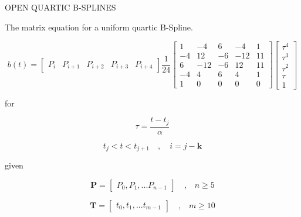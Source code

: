 \documentclass{article}
\begin{document}
\hspace{1cm}
    
OPEN QUARTIC B-SPLINES
\hfill \break

    The matrix equation for a uniform quartic B-Spline.
    
    \begin{equation}
        b(t) = \begin{bmatrix} P_i & P_{i+1} & P_{i+2} & P_{i+3} & P_{i+4} \end{bmatrix} \frac{1}{24} \begin{bmatrix} 1 & -4  &  6 & -4  & 1 \\
                                                  -4 &  12 & -6 & -12 & 11\\
                                                   6 & -12 & -6 &  12 & 11\\
                                                  -4 &  4  &  6 &  4  & 1 \\
                                                   1 &  0  &  0 &  0  & 0\end{bmatrix} \begin{bmatrix} \tau^4 \\ \tau^3 \\ \tau^2 \\ \tau \\ 1 \end{bmatrix}
    \end{equation}
    
    for
    
    \begin{equation}
        \tau = \frac{t-t_j}{\alpha}
    \end{equation}
    
    \begin{equation}
        t_j < t < t_{j+1} \quad , \quad i = j-\textbf{k}
    \end{equation}
    
    given
    
    \begin{equation}
    \textbf{P} = \begin{bmatrix} P_0, P_1, ... P_{n-1} \end{bmatrix} \quad \text{,} \quad n \geq 5
    \end{equation}
    
    \begin{equation}
        \textbf{T} = \begin{bmatrix} t_0, t_1, ... t_{m-1} \end{bmatrix} \quad \text{,} \quad m \geq 10
    \end{equation}
\end{document}
